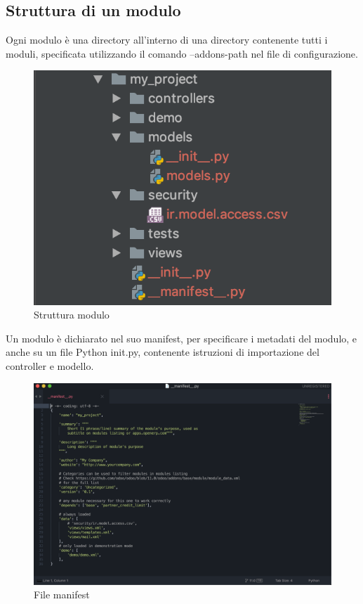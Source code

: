 \subsection{Struttura di un modulo}
Ogni modulo è una directory all'interno di una directory contenente tutti i moduli, specificata utilizzando il comando --addons-path nel file di configurazione.
\begin{figure}[H]
	\begin{center} \includegraphics[scale=0.5]{figures/structure_odoo}
		\caption[Struttura di un modulo]{Struttura modulo}
		\label{fig:structure_odoo}
	\end{center}
\end{figure}

Un modulo è dichiarato nel suo manifest, per specificare i metadati del modulo, e anche su un file Python init.py, contenente istruzioni di importazione del controller e modello.
\begin{figure}[H]
	\begin{center} \includegraphics[scale=0.4]{figures/manifest}
		\caption[File manifest]{File manifest}
		\label{fig:manifest}
	\end{center}
\end{figure}

